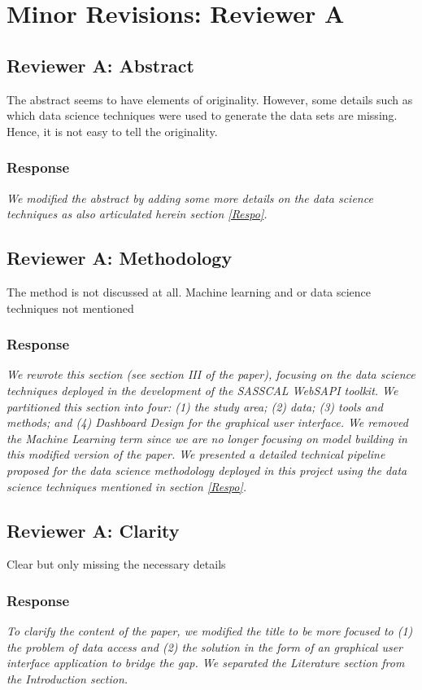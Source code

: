 \documentclass[a4paper, 12pt, conference]{ieeeconf}      %
\begin{document}
			\section{Minor Revisions: Reviewer A}
	\subsection{\textbf{Reviewer A:} Abstract}
	The abstract seems to have elements of originality. However, some details such as which data science techniques were used to generate the data sets are missing. Hence, it is not easy to tell the originality.
	
	\subsubsection{\textbf{Response}}
	 \emph{We modified the abstract by adding some more details on the data science techniques as also articulated herein section \ref{Respo}.}
	
	\subsection{\textbf{Reviewer A:} Methodology}
	The method is not discussed at all. Machine learning and or data science techniques not mentioned
	
	\subsubsection{\textbf{Response}}
\emph{We rewrote this section (see section III of the paper), focusing on the data science techniques deployed in the development of the SASSCAL WebSAPI toolkit. We partitioned this section into four: (1) the study area; (2) data; (3) tools and methods; and (4) Dashboard Design for the graphical user interface. We removed the Machine Learning term since we are no longer focusing on model building in this modified version of the paper. We presented a detailed technical pipeline proposed for  the data science methodology deployed in this project using the data science techniques mentioned in section \ref{Respo}. }

	\subsection{\textbf{Reviewer A:} Clarity}
	Clear but only missing the necessary details
	\subsubsection{\textbf{Response}}
	\emph{To clarify the content of the paper, we modified the title to be more focused to (1) the problem of data access and (2) the solution in the form of an graphical user interface application to bridge the gap. We separated the Literature section from the Introduction section. }
	
\end{document}

